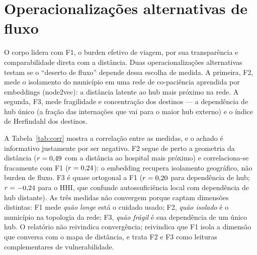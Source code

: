 
\appendix

\section{Operacionalizações alternativas de fluxo}
\label{ap:medidas}

O corpo lidera com F1, o burden efetivo de viagem, por sua transparência e
comparabilidade direta com a distância. Duas operacionalizações alternativas
testam se o ``deserto de fluxo'' depende dessa escolha de medida. A primeira, F2,
mede o isolamento do município em uma rede de co-paciência aprendida por
embeddings (node2vec): a distância latente ao hub mais próximo na rede. A segunda,
F3, mede fragilidade e concentração dos destinos --- a dependência de hub único
(a fração das internações que vai para o maior hub externo) e o índice de
Herfindahl dos destinos.

A Tabela~\ref{tab:corr} mostra a correlação entre as medidas, e o achado é
informativo justamente por ser negativo. F2 segue de perto a geometria da
distância ($r=0{,}49$ com a distância ao hospital mais próximo) e
correlaciona-se fracamente com F1 ($r=0{,}24$): o embedding recupera
isolamento geográfico, não burden de fluxo. F3 é quase ortogonal a F1
($r=0{,}20$ para dependência de hub; $r=-0{,}24$ para o HHI, que
confunde autossuficiência local com dependência de
hub distante). As três medidas não convergem porque captam dimensões distintas:
F1 mede \emph{quão longe} está o cuidado usado; F2, \emph{quão isolado} é o
município na topologia da rede; F3, \emph{quão frágil} é sua dependência de um
único hub. O relatório não reivindica convergência; reivindica que F1 isola a
dimensão que conversa com o mapa de distância, e trata F2 e F3 como leituras
complementares de vulnerabilidade.

